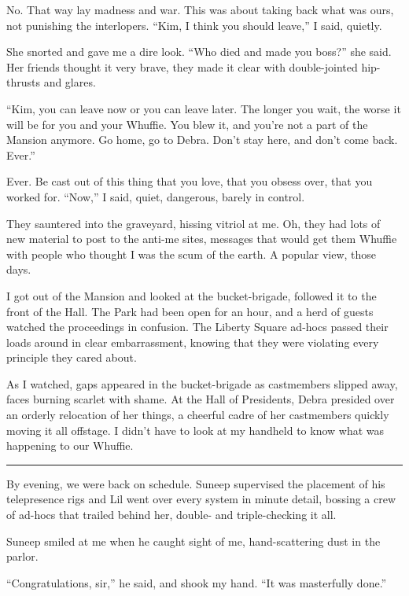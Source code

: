 No. That way lay madness and war. This was about taking back what
was ours, not punishing the interlopers. “Kim, I think you should
leave,” I said, quietly.

She snorted and gave me a dire look. “Who died and made you boss?”
she said. Her friends thought it very brave, they made it clear
with double-jointed hip-thrusts and glares.

“Kim, you can leave now or you can leave later. The longer you
wait, the worse it will be for you and your Whuffie. You blew it,
and you're not a part of the Mansion anymore. Go home, go to Debra.
Don't stay here, and don't come back. Ever.”

Ever. Be cast out of this thing that you love, that you obsess
over, that you worked for. “Now,” I said, quiet, dangerous, barely
in control.

They sauntered into the graveyard, hissing vitriol at me. Oh, they
had lots of new material to post to the anti-me sites, messages
that would get them Whuffie with people who thought I was the scum
of the earth. A popular view, those days.

I got out of the Mansion and looked at the bucket-brigade, followed
it to the front of the Hall. The Park had been open for an hour,
and a herd of guests watched the proceedings in confusion. The
Liberty Square ad-hocs passed their loads around in clear
embarrassment, knowing that they were violating every principle
they cared about.

As I watched, gaps appeared in the bucket-brigade as castmembers
slipped away, faces burning scarlet with shame. At the Hall of
Presidents, Debra presided over an orderly relocation of her
things, a cheerful cadre of her castmembers quickly moving it all
offstage. I didn't have to look at my handheld to know what was
happening to our Whuffie.

\begin{center}\rule{3in}{0.4pt}\end{center}

By evening, we were back on schedule. Suneep supervised the
placement of his telepresence rigs and Lil went over every system
in minute detail, bossing a crew of ad-hocs that trailed behind
her, double- and triple-checking it all.

Suneep smiled at me when he caught sight of me, hand-scattering
dust in the parlor.

“Congratulations, sir,” he said, and shook my hand. “It was
masterfully done.”

